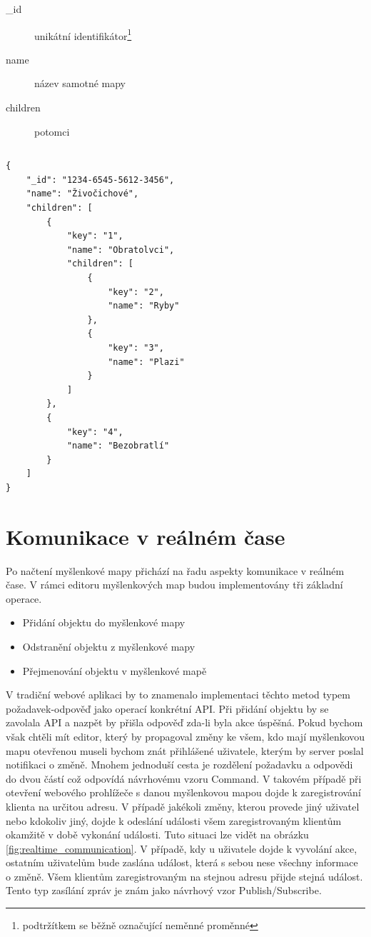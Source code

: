 \begin{description}
\item[\_id] unikátní identifikátor\footnote{podtržítkem se běžně označující neměnné proměnné}
\item[name] název samotné mapy
\item[children] potomci
\end{description}

\begin{lstlisting}
\end{lstlisting}

\begin{lstlisting}
{
	"_id": "1234-6545-5612-3456",
	"name": "Živočichové",
	"children": [
		{
			"key": "1",
			"name": "Obratolvci",
			"children": [
				{
					"key": "2",
					"name": "Ryby"
				},
				{
					"key": "3",
					"name": "Plazi"
				}
			]
		},
		{
			"key": "4",
			"name": "Bezobratlí"
		}
	]
}
\end{lstlisting}

\section{Komunikace v reálném čase}\label{sec:realTimeCommunication}

Po načtení myšlenkové mapy přichází na řadu aspekty komunikace v reálném čase. V rámci editoru myšlenkových map budou implementovány tři základní operace.
\begin{itemize}
\item Přidání objektu do myšlenkové mapy
\item Odstranění objektu z myšlenkové mapy
\item Přejmenování objektu v myšlenkové mapě
\end{itemize}
V tradiční webové aplikaci by to znamenalo implementaci těchto metod typem požadavek-odpověď jako operací konkrétní API. Při přidání objektu by se zavolala API a nazpět by přišla odpověď zda-li byla akce úspěšná. Pokud bychom však chtěli mít editor, který by propagoval změny ke všem, kdo mají myšlenkovou mapu otevřenou museli bychom znát přihlášené uživatele, kterým by server poslal notifikaci o změně. Mnohem jednoduší cesta je rozdělení požadavku a odpovědi do dvou částí což odpovídá návrhovému vzoru Command. V takovém případě při otevření webového prohlížeče s danou myšlenkovou mapou dojde k zaregistrování klienta na určitou adresu. V případě jakékoli změny, kterou provede jiný uživatel nebo kdokoliv jiný, dojde k odeslání události všem zaregistrovaným klientům okamžitě v době vykonání události. Tuto situaci lze vidět na obrázku \ref{fig:realtime_communication}. V případě, kdy u uživatele dojde k vyvolání akce, ostatním uživatelům bude zaslána událost, která s sebou nese všechny informace o změně. Všem klientům zaregistrovaným na stejnou adresu přijde stejná událost. Tento typ zasílání zpráv je znám jako návrhový vzor Publish/Subscribe.

